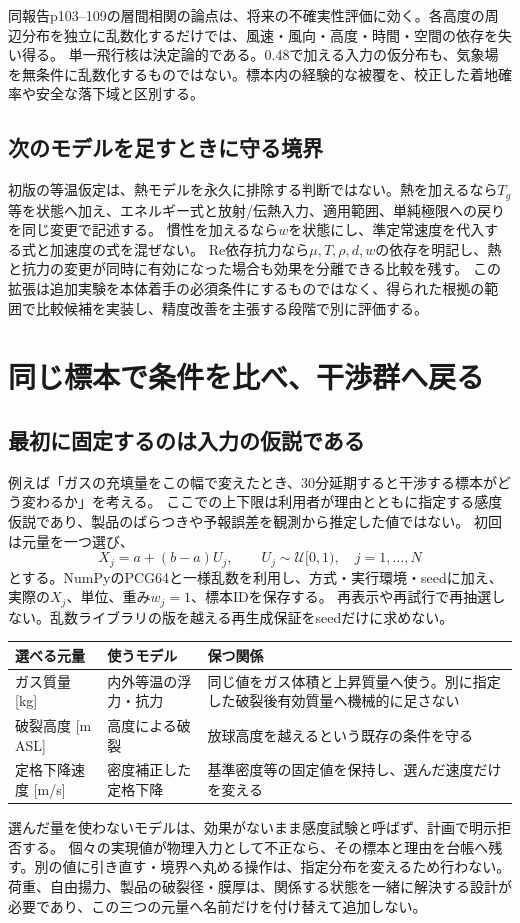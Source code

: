 \documentclass[11pt,a4paper]{article}
\begin{document}
同報告p103--109の層間相関の論点は、将来の不確実性評価に効く。各高度の周辺分布を独立に乱数化するだけでは、風速・風向・高度・時間・空間の依存を失い得る。
単一飛行核は決定論的である。0.48で加える入力の仮分布も、気象場を無条件に乱数化するものではない。標本内の経験的な被覆を、校正した着地確率や安全な落下域と区別する。

\subsection{次のモデルを足すときに守る境界}
初版の等温仮定は、熱モデルを永久に排除する判断ではない。熱を加えるなら$T_g$等を状態へ加え、エネルギー式と放射/伝熱入力、適用範囲、単純極限への戻りを同じ変更で記述する。
慣性を加えるなら$w$を状態にし、準定常速度を代入する式と加速度の式を混ぜない。
Re依存抗力なら$\mu,T,\rho,d,w$の依存を明記し、熱と抗力の変更が同時に有効になった場合も効果を分離できる比較を残す。
この拡張は追加実験を本体着手の必須条件にするものではなく、得られた根拠の範囲で比較候補を実装し、精度改善を主張する段階で別に評価する。

\clearpage
\section{同じ標本で条件を比べ、干渉群へ戻る}\label{th:ensemble}
\subsection{最初に固定するのは入力の仮説である}
例えば「ガスの充填量をこの幅で変えたとき、30分延期すると干渉する標本がどう変わるか」を考える。
ここでの上下限は利用者が理由とともに指定する感度仮説であり、製品のばらつきや予報誤差を観測から推定した値ではない。
初回は元量を一つ選び、
\begin{equation}
 X_j=a+(b-a)U_j,\qquad U_j\sim\mathcal U[0,1),\quad j=1,\ldots,N
 \label{eq:sensitivity}
\end{equation}
とする。NumPyのPCG64と一様乱数を利用し、方式・実行環境・seedに加え、実際の$X_j$、単位、重み$w_j=1$、標本IDを保存する。
再表示や再試行で再抽選しない。乱数ライブラリの版を越える再生成保証をseedだけに求めない。

\begin{longtable}{@{}p{.28\linewidth}p{.29\linewidth}p{.37\linewidth}@{}}
\toprule 選べる元量 & 使うモデル & 保つ関係 \\\midrule\endhead
ガス質量 [kg] & 内外等温の浮力・抗力 & 同じ値をガス体積と上昇質量へ使う。別に指定した破裂後有効質量へ機械的に足さない \\
破裂高度 [m ASL] & 高度による破裂 & 放球高度を越えるという既存の条件を守る \\
定格下降速度 [m/s] & 密度補正した定格下降 & 基準密度等の固定値を保持し、選んだ速度だけを変える \\\bottomrule
\end{longtable}
選んだ量を使わないモデルは、効果がないまま感度試験と呼ばず、計画で明示拒否する。
個々の実現値が物理入力として不正なら、その標本と理由を台帳へ残す。別の値に引き直す・境界へ丸める操作は、指定分布を変えるため行わない。
荷重、自由揚力、製品の破裂径・膜厚は、関係する状態を一緒に解決する設計が必要であり、この三つの元量へ名前だけを付け替えて追加しない。
\end{document}
